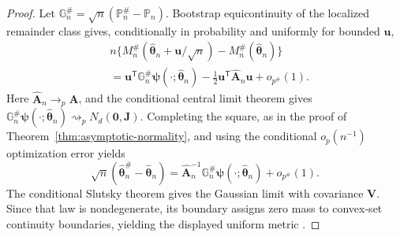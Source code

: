 \begin{proof}
Let $\mathbb G_n^\#=\sqrt n(\mathbb P_n^\#-\mathbb P_n)$. Bootstrap
equicontinuity of the localized remainder class gives, conditionally in
probability and uniformly for bounded $\mathbf u$,
\begin{align*}
 &n\{M_n^\#(\widehat{\boldsymbol\theta}_n+\mathbf u/\sqrt n)
       -M_n^\#(\widehat{\boldsymbol\theta}_n)\}\\
 &=\mathbf u^\mathsf T\mathbb G_n^\#
   \boldsymbol\psi(\cdot;\widehat{\boldsymbol\theta}_n)
   -\tfrac12\mathbf u^\mathsf T\widehat{\mathbf A}_n\mathbf u
   +o_{p^\#}(1).
\end{align*}
Here $\widehat{\mathbf A}_n\to_p\mathbf A$, and the conditional central limit
theorem gives
$\mathbb G_n^\#\boldsymbol\psi(\cdot;\widehat{\boldsymbol\theta}_n)
\rightsquigarrow_{p}N_d(\mathbf0,\mathbf J)$. Completing the square, as in the
proof of Theorem~\ref{thm:asymptotic-normality}, and using the conditional
$o_p(n^{-1})$ optimization error yields
\[
 \sqrt n(\widehat{\boldsymbol\theta}_n^\#-\widehat{\boldsymbol\theta}_n)
 =\widehat{\mathbf A}_n^{-1}\mathbb G_n^\#
 \boldsymbol\psi(\cdot;\widehat{\boldsymbol\theta}_n)+o_{p^\#}(1).
\]
The conditional Slutsky theorem gives the Gaussian limit with covariance
$\mathbf V$. Since that law is nondegenerate, its boundary assigns zero mass
to convex-set continuity boundaries, yielding the displayed uniform metric
\citep{van1996weak}.
\end{proof}
